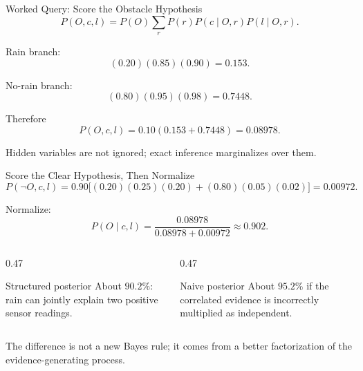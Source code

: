 \documentclass[aspectratio=169,10pt]{beamer}
\begin{document}
\begin{frame}[shrink=10]{Worked Query: Score the Obstacle Hypothesis}
  \[
    P(O,c,l)
    =
    P(O)\sum_r P(r)P(c\mid O,r)P(l\mid O,r).
  \]

  Rain branch:
  \[
    (0.20)(0.85)(0.90)=0.153.
  \]

  No-rain branch:
  \[
    (0.80)(0.95)(0.98)=0.7448.
  \]

  Therefore
  \[
    P(O,c,l)
    =
    0.10(0.153+0.7448)
    =0.08978.
  \]

  \begin{keyidea}
    Hidden variables are not ignored; exact inference marginalizes over them.
  \end{keyidea}
\end{frame}

\begin{frame}[shrink=10]{Score the Clear Hypothesis, Then Normalize}
  \[
    P(\neg O,c,l)
    =
    0.90\Big[(0.20)(0.25)(0.20)+(0.80)(0.05)(0.02)\Big]
    =0.00972.
  \]

  Normalize:
  \[
    P(O\mid c,l)
    =
    \frac{0.08978}{0.08978+0.00972}
    \approx 0.902.
  \]

  \begin{columns}[T,onlytextwidth]
    \begin{column}{0.47\textwidth}
      \begin{block}{Structured posterior}
        About $90.2\%$: rain can jointly explain two positive sensor readings.
      \end{block}
    \end{column}
    \begin{column}{0.47\textwidth}
      \begin{block}{Naive posterior}
        About $95.2\%$ if the correlated evidence is incorrectly multiplied as independent.
      \end{block}
    \end{column}
  \end{columns}

  \begin{keyidea}
    The difference is not a new Bayes rule; it comes from a better factorization of the evidence-generating process.
  \end{keyidea}
\end{frame}
\end{document}
